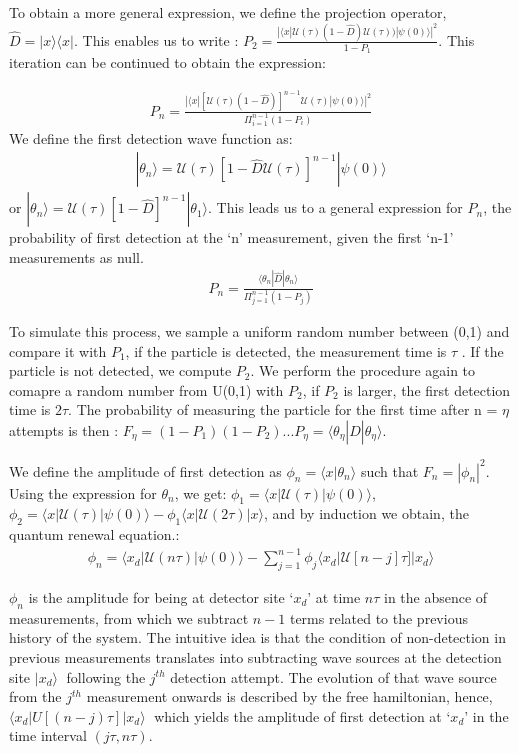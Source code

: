 \documentclass{article}
\begin{document}
To obtain a more general expression, we define the projection operator, $\hat{D} = |x\rangle\langle x|$. This enables us to write : 
$P_2 = \frac{|\langle x|\mathcal{U}(\tau)(1-\hat{D})\mathcal{U}(\tau))| \psi(0)\rangle|^2}{1-P_1}$. This iteration can be continued to obtain the expression: 

\begin{align}
    P_n = \frac{|\langle x| [\mathcal{U}(\tau)(1-\hat{D})]^{n-1}\mathcal{U}(\tau)| \psi(0) \rangle |^2}{\Pi_{i=1}^{n-1} (1-P_{i})}
\end{align}
We define the first detection wave function as: 
\begin{align}
    |\theta _n\rangle = \mathcal{U}(\tau) [1-\hat{D}\mathcal{U}(\tau)]^{n-1} |\psi(0)\rangle
\end{align}
 or $| \theta _n \rangle = \mathcal{U}(\tau)[1-\hat{D}]^{n-1}|\theta_1\rangle$. This leads us to a general expression for $P_n$, the probability of first detection at the `n' measurement, given the first `n-1' measurements as null. 
\begin{align}
\label{eq_qre_1}
    P_n = \frac{\langle \theta_n | \hat{D} | \theta_n \rangle}{\Pi_{j=1}^{n-1}(1-P_j)}
\end{align}

To simulate this process, we sample a uniform random number between (0,1) and compare it with $P_1$, if the particle is detected, the measurement time is $\tau$ . If the particle is not detected, we compute $P_2$. We perform the procedure again to comapre a random number from U(0,1) with $P_2$, if $P_2$ is larger, the first detection time is $2\tau$. The probability of measuring the particle for the first time after n = $\eta$ attempts is then : $F_{\eta} = (1-P_1)(1-P_2)...P_{\eta} = \langle \theta _{\eta} | \hat{D} | \theta_{\eta} \rangle$. 

We define the amplitude of first detection as $\phi _n = \langle x | \theta _n \rangle$ such that $F_n = |\phi_n|^2$. Using the expression for $\theta_n$, we get: $\phi_1 = \langle x | \mathcal{U}(\tau)|\psi(0)\rangle$, $\phi_2 = \langle x | \mathcal{U}(\tau)|\psi(0)\rangle - \phi_1 \langle x|\mathcal{U}(2\tau)|x\rangle$, and by induction we obtain, the quantum renewal equation.: 
\begin{align}
    \label{eq_qre_2}
    \phi_n = \langle x_d|\mathcal{U}(n\tau)|\psi(0)\rangle - \sum_{j=1}^{n-1} \phi_j \langle x_d | \mathcal{U}[n-j]\tau]|x_d\rangle
\end{align}

$\phi_n$ is the amplitude for being at detector site `$x_d$' at time $n\tau$ in the absence of measurements, from which we subtract $n-1$ terms related to the previous history of the system. The intuitive idea is that the condition of non-detection in previous measurements translates into subtracting wave sources at the detection site $|x_d\rangle$ following the $j^{th}$ detection attempt. The evolution of that wave source from the $j^{th}$ measurement onwards is described by the free hamiltonian, hence, $\langle x_d |U [(n-j )\tau]|x_d\rangle$ which yields the amplitude of first detection at `$x_d$' in the time interval $(j \tau,n\tau )$.
\end{document}
